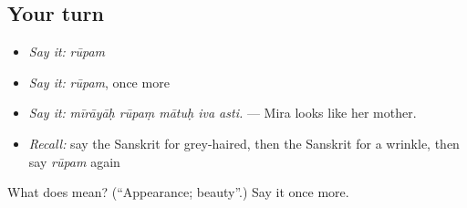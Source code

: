 \subsection*{Your turn}
\begin{itemize}
\raggedright
  \item \emph{Say it:} \emph{rūpam}
  \item \emph{Say it:} \emph{rūpam}, once more
  \item \emph{Say it:} \emph{mīrāyāḥ rūpaṃ mātuḥ iva asti.} — Mira looks like her mother.
  \item \emph{Recall:} say the Sanskrit for grey-haired, then the Sanskrit for a wrinkle, then say \emph{rūpam} again
\end{itemize}

\begin{tcolorbox}[breakable,colback=teal!4,colframe=teal!35!black,title={Before you move on}]
What does  mean? (\textquotedblleft{}Appearance; beauty\textquotedblright{}.) Say it once more.
\end{tcolorbox}
